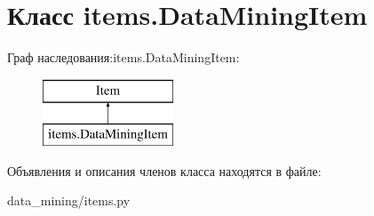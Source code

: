 \hypertarget{classitems_1_1DataMiningItem}{}\section{Класс items.\+Data\+Mining\+Item}
\label{classitems_1_1DataMiningItem}
Граф наследования\+:items.\+Data\+Mining\+Item\+:\begin{figure}[H]
\begin{center}
\leavevmode
\includegraphics[height=2.000000cm]{classitems_1_1DataMiningItem}
\end{center}
\end{figure}


Объявления и описания членов класса находятся в файле\+:\begin{DoxyCompactItemize}
\item 
data\+\_\+mining/items.\+py\end{DoxyCompactItemize}

